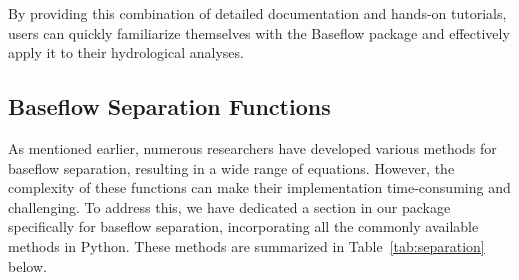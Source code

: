 \documentclass[hydrology,article,submit,pdftex,moreauthors]{Definitions/mdpi}
\begin{document}
By providing this combination of detailed documentation and hands-on tutorials, users can quickly familiarize themselves with the Baseflow package and effectively apply it to their hydrological analyses.

\subsection{Baseflow Separation Functions}
\label{sec:separation_functions}

As mentioned earlier, numerous researchers have developed various methods for baseflow separation, resulting in a wide range of equations. However, the complexity of these functions can make their implementation time-consuming and challenging. To address this, we have dedicated a section in our package specifically for baseflow separation, incorporating all the commonly available methods in Python. These methods are summarized in Table~\ref{tab:separation} below.
\end{document}
